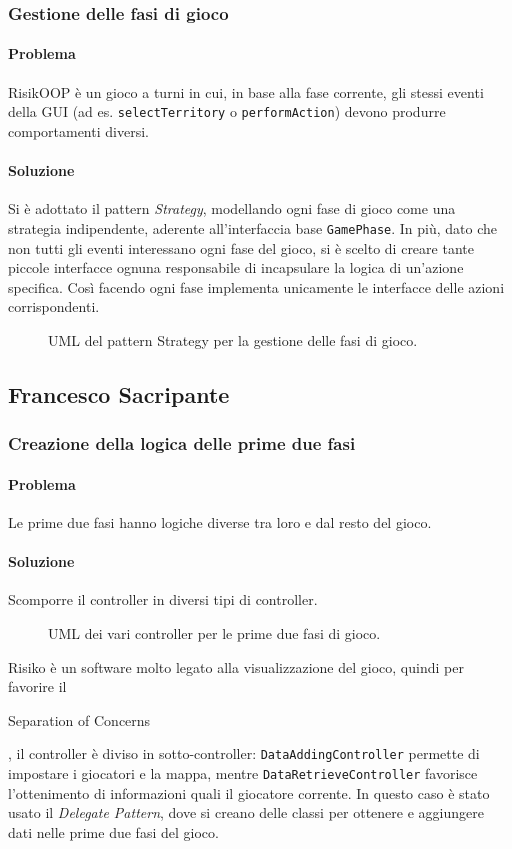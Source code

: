 \documentclass[a4paper,12pt]{report}
\begin{document}
\subsubsection{Gestione delle fasi di gioco}
\paragraph{Problema}
RisikOOP è un gioco a turni in cui, in base alla fase corrente, gli stessi eventi della GUI (ad es. \texttt{selectTerritory} o \texttt{performAction}) devono produrre comportamenti diversi.
\paragraph{Soluzione}
Si è adottato il pattern \textit{Strategy}, modellando ogni fase di gioco come una strategia indipendente, aderente all'interfaccia base \texttt{GamePhase}.
In più, dato che non tutti gli eventi interessano ogni fase del gioco, si è scelto di creare tante piccole interfacce ognuna responsabile di incapsulare la logica di un'azione specifica. Così facendo ogni fase implementa unicamente le interfacce delle azioni corrispondenti.
\begin{figure}[H]
	\centering
	
	\caption{UML del pattern Strategy per la gestione delle fasi di gioco.}
\end{figure}
\subsection{Francesco Sacripante}
\subsubsection{Creazione della logica delle prime due fasi}
\paragraph{Problema}
Le prime due fasi hanno logiche diverse tra loro e dal resto del gioco.
\paragraph{Soluzione}
Scomporre il controller in diversi tipi di controller.
\begin{figure}[H]
	\centering
	
	\caption{UML dei vari controller per le prime due fasi di gioco.}
\end{figure}
Risiko è un software molto legato alla visualizzazione del gioco, quindi per favorire il \begin{itshape}Separation of Concerns\end{itshape}, il controller è diviso in sotto-controller: \texttt{DataAddingController} permette di impostare i giocatori e la mappa, mentre \texttt{DataRetrieveController} favorisce l'ottenimento di informazioni quali il giocatore corrente.
In questo caso è stato usato il \textit{Delegate Pattern}, dove si creano delle classi per ottenere e aggiungere dati nelle prime due fasi del gioco.
\end{document}
